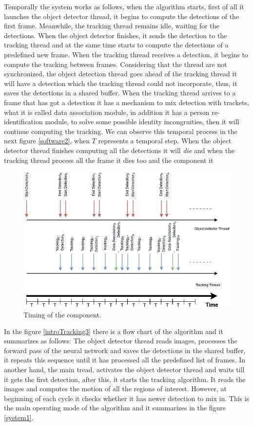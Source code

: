 Temporally the system works as follows, when the algorithm starts, first of all it launches the object detector thread, it begins to compute the detections of the first frame. Meanwhile, the tracking thread remains idle, waiting for the detections. When the object detector finishes, it sends the detection to the tracking thread and at the same time starts to compute the detections of a predefined new frame. When the tracking thread receives a detection, it begins to compute the tracking between frames. Considering that the thread are not synchronized, the object detection thread goes ahead of the tracking thread it will have a detection which the tracking thread could not incorporate, thus, it saves the detections in a shared buffer. When the tracking thread arrives to a frame that has got a detection it has a mechanism to mix detection with trackets, what it is called data association module, in addition it has a person re-identification module, to solve some possible identity incongruities, then it will continue computing the tracking. We can observe this temporal process in the next figure \ref{software2}, when $T$ represents a temporal step. When the object detector thread finishes computing all the detections it will \textit{die} and when the tracking thread process all the frame it dies too and the component it 


\begin{figure}[H]
\centering         
\includegraphics[width=14cm]{timesDiagram/timing3.png}
\caption{Timing of the component.} \label{intro1}
\end{figure}


In the figure \ref{introTracking3} there is a flow chart of the algorithm and it summarizes as follows: The object detector thread reads images, processes the forward pass of the neural network and saves the detections in the shared buffer, it repeats this sequence until it has processed all the predefined list of frames. In another hand, the main tread, activates the object detector thread and waits till it gets the first detection, after this, it starts the tracking algorithm. It reads the images and computes the motion of all the regions of interest. However, at beginning of each cycle it checks whether it has newer detection to mix in. This is the main operating mode of the algorithm and it summarizes in the figure \ref{system1}. 

